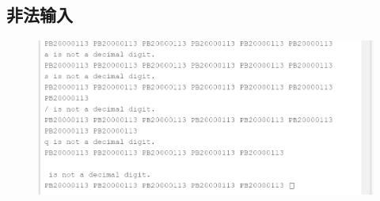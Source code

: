 \documentclass[UTF8]{ctexart}
\begin{document}
\subsection{非法输入}
    \begin{figure}[htbp]
        \centering
        \includegraphics[scale=0.6]{r.png}
    \end{figure}
\end{document}
